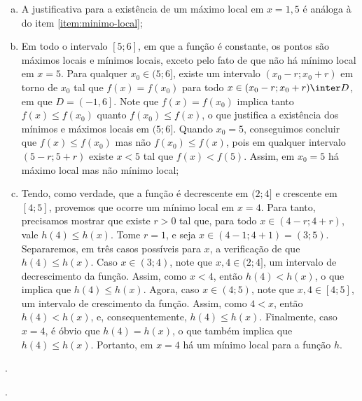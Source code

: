 \begin{solution}
\begin{enumerate}[(a)]
		\item A justificativa para a existência de um máximo local em $x=1{,}5$ é análoga à do item \ref{item:minimo-local};
		\item Em todo o intervalo $[5; 6]$, em que a função é constante, 
		os pontos são máximos locais e mínimos locais, exceto pelo fato de que não há mínimo local em $x=5$. 
		Para qualquer $x_0\in (5;6]$, existe um intervalo $(x_0 - r; x_0+r)$ em torno de $x_0$ tal que $f(x)= f(x_0)$ para todo $x \in (x_0 - r; x_0+r) \inter D$, em que $D = \left(-1,6\right]$.
		Note que $f(x)= f(x_0)$ implica tanto $f(x) \leq f(x_0)$ quanto $f(x_0)\leq f(x)$, 
		o que justifica a existência dos mínimos e máximos locais em $(5;6]$. 
		Quando $x_0=5$, conseguimos concluir que $f(x) \le f(x_0)$ mas não $f(x_0) \le f(x)$, 
		pois em qualquer intervalo $(5 - r; 5+r)$ existe $x < 5$ tal que $f(x) < f(5)$.
		Assim, em $x_0=5$ há máximo local mas não mínimo local;
		\item \label{item:minimo-local-formal} Tendo, como verdade, que a função é decrescente em $(2; 4]$ e crescente em $[4; 5]$, 
		provemos que ocorre um mínimo local em $x=4$. Para tanto, precisamos mostrar que existe $r>0$ tal que, 
		para todo $x \in (4-r; 4+r)$, vale $h(4) \leq h(x)$. 
		Tome $r=1$, e seja $x \in (4-1; 4+1) = (3; 5)$. 
		Separaremos, em três casos possíveis para $x$, a verificação de que $h(4) \leq h(x)$. 
		Caso $x \in (3; 4)$, note que $x, 4 \in (2; 4]$, um intervalo de decrescimento da função. 
		Assim, como $x<4$, então $h(4)< h(x)$, o que implica que $h(4) \leq h(x)$. 
		Agora, caso $x \in (4; 5)$, note que $x, 4 \in [4; 5]$, um intervalo de crescimento da função. 
		Assim, como $4<x$, então $h(4)< h(x)$, e, consequentemente, $h(4)\le h(x)$.
		Finalmente, caso $x=4$, é óbvio que $h(4)=h(x)$, o que também implica que $h(4)\le h(x)$. 
		Portanto, em $x=4$ há um mínimo local para a função $h$.
	\end{enumerate}
\end{solution}

\begin{tve}
	.
\end{tve}

\begin{tve}
	.
\end{tve}


